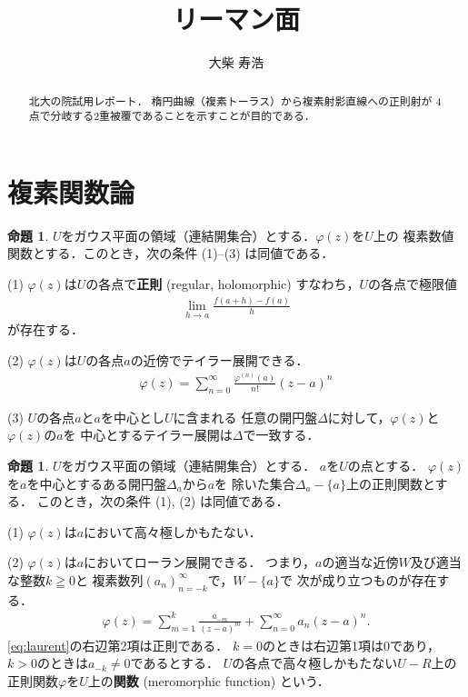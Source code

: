 \documentclass[11pt, a4paper, dvipdfmx]{jsarticle}
\theoremstyle{definition}
\newtheorem{Proposition}[Axiom]{命題}
\newcommand{\pphi}{\varphi} %
\theoremstyle{mystyle}
\numberwithin{equation}{section} %
\begin{document}
\title{リーマン面}
\author{大柴 寿浩}
\date{}

\begin{titlepage}
\maketitle
\begin{abstract}
    北大の院試用レポート．
    楕円曲線（複素トーラス）から複素射影直線への正則射が
    4点で分岐する2重被覆であることを示すことが目的である．
\end{abstract}
\thispagestyle{empty}
\end{titlepage}
\section{複素関数論}


\begin{Proposition}
    $U$をガウス平面の領域（連結開集合）とする．$\pphi(z)$を$U$上の
    複素数値関数とする．このとき，次の条件 (1)--(3) は同値である．

    (1) 
    $\pphi(z)$は$U$の各点で\textbf{正則} (regular, holomorphic) すなわち，$U$の各点で極限値\begin{align*}
        \lim_{h\to a}\frac{f(a+h)-f(a)}{h}
    \end{align*}が存在する．

    (2) 
    $\pphi(z)$は$U$の各点$a$の近傍でテイラー展開できる．
    \begin{align*}
        \pphi(z)=\sum_{n=0}^{\infty}\frac{\pphi^{(n)}(a)}{n!}(z-a)^{n}
    \end{align*}

    (3) 
    $U$の各点$a$と$a$を中心とし$U$に含まれる
    任意の開円盤$\Delta$に対して，$\pphi(z)$と$\pphi(z)$の$a$を
    中心とするテイラー展開は$\Delta$で一致する．
\end{Proposition}

\begin{Proposition}
    $U$をガウス平面の領域（連結開集合）とする．
    $a$を$U$の点とする．
    $\pphi(z)$を$a$を中心とするある開円盤$\Delta_a$から$a$を
    除いた集合$\Delta_a-\{a\}$上の正則関数とする．
    このとき，次の条件 (1), (2) は同値である．

    (1) 
    $\pphi(z)$は$a$において高々極しかもたない．

    (2) 
    $\pphi(z)$は$a$においてローラン展開できる．
    つまり，$a$の適当な近傍$W$及び適当な整数$k\geqq0$と
    複素数列$(a_n)_{n=-k}^{\infty}$で，$W-\{a\}$で
    次が成り立つものが存在する．
    \begin{align}
        \pphi(z)=\sum_{m=1}^{k}\frac{a_{-m}}{(z-a)^{m}}
        +\sum_{n=0}^{\infty}a_n(z-a)^{n}. \label{eq:laurent}
    \end{align}
    \eqref{eq:laurent}の右辺第2項は正則である．
    $k=0$のときは右辺第1項は$0$であり，
    $k>0$のときは$a_{-k}\ne0$であるとする．
    $U$の各点で高々極しかもたない$U-R$上の
    正則関数$\pphi$を$U$上の\textbf{関数} (meromorphic function) という．
\end{Proposition}
\end{document}
